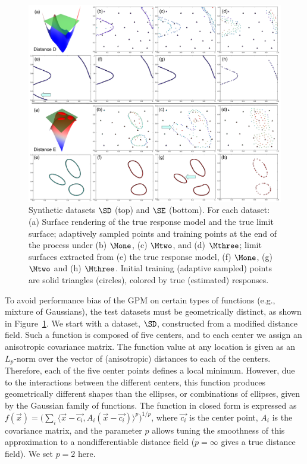 \begin{figure}[b]
\centering
\includegraphics[width=1.0\textwidth]{figs/chap5/synthetic-D-E-DF.pdf}
\caption{Synthetic datasets $\protect\SD$ (top) and $\protect\SE$ (bottom).
For each dataset: (a) Surface rendering of the true response model and the true limit surface; adaptively sampled points and training points at the end of the process under (b) $\protect\Mone$, (c) $\protect\Mtwo$, and (d) $\protect\Mthree$;
limit surfaces extracted from (e) the true response model, (f) $\protect\Mone$, (g) $\protect\Mtwo$ and (h) $\protect\Mthree$.
Initial training (adaptive sampled) points are solid triangles (circles), colored by true (estimated)  responses.
}
\label{fig:synthetic-D-E-DF}
\end{figure}

To avoid performance bias of the GPM on certain types of functions (e.g., mixture of Gaussians), the test datasets must be geometrically distinct, as shown in Figure~\ref{fig:synthetic-D-E-DF}.
%
We start with a dataset, $\SD$, constructed from a modified distance field.
%
Such a function is composed of five centers, and to each center we assign an anisotropic covariance matrix.
%
The function value at any location is given as an $L_p$-norm over the vector of (anisotropic) distances to each of the centers.
%
Therefore, each of the five center points defines a local minimum.
%
However, due to the interactions between the different centers, this function produces geometrically different shapes than the ellipses, or combinations of ellipses, given by the Gaussian family of functions.
%
The function in closed form is expressed as
$f(\vec{x}) = \bigl(\sum_i \langle\vec{x}-\vec{c_i},A_i(\vec{x}-\vec{c_i})
\rangle^{p}\bigr)^{1/p}$, where $\vec{c_i}$ is the center point, $A_i$ is the covariance matrix, and the parameter $p$ allows tuning the smoothness of this approximation to a nondifferentiable distance field ($p = \infty$ gives a true distance field).
%
We set $p=2$ here.

